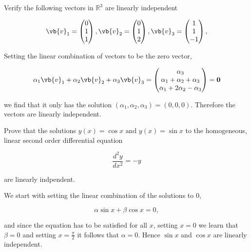 \documentclass[a4paper,12pt]{report}
\begin{document}
{Verify the following vectors in \(\mathbb{R}^3 \) are linearly independent 

\begin{equation}
    \vb{v} _{1} = \begin{pmatrix}
         0 \\
         1 \\
         1 \\
    \end{pmatrix}, \vb{v} _{2} = \begin{pmatrix}
         0 \\
         1 \\
         2 \\
    \end{pmatrix}, \vb{v} _{3} = \begin{pmatrix}
         1 \\
         1 \\
         -1 \\
    \end{pmatrix}, 
\end{equation}}
{Setting the linear combination of vectors to be the zero vector,

\begin{equation}
    \alpha _{1}\vb{v} _{1} + \alpha _{2} \vb{v} _{2} + \alpha _{3} \vb{v} _{3} = \begin{pmatrix}
         \alpha _{3}  \\
         \alpha _{1} + \alpha _{2} + \alpha _{3}   \\
         \alpha _{1} + 2\alpha _{2} - \alpha _{3}   \\
    \end{pmatrix} = \boldsymbol{0} 
\end{equation}

we find that it only has the solution \((\alpha _{1}, \alpha _{2}, \alpha _{3}   ) = (0,0,0)\). Therefore the vectors are linearly independent.
} 

{Prove that the solutions \(y(x) = \cos x \text { and } y(x) = \sin x\)  to the homogeneous, linear second order differential equation 

\begin{equation}
    \frac{d^2y}{dx^2} = -y
\end{equation}

are linearly indpendent.}
{We start with setting the linear combination of the solutions to 0,

\begin{equation}
    \alpha \sin x+ \beta \cos x= 0,
\end{equation}

and since the equation has to be satisfied for all \(x\),  setting \(x=0\) we learn that \(\beta =0\) and setting \(x=\frac{\pi }{2} \) it follows that \(\alpha = 0\). Hence \(\sin x\) and \(\cos x\)  are linearly independent. 
} 
\end{document}
